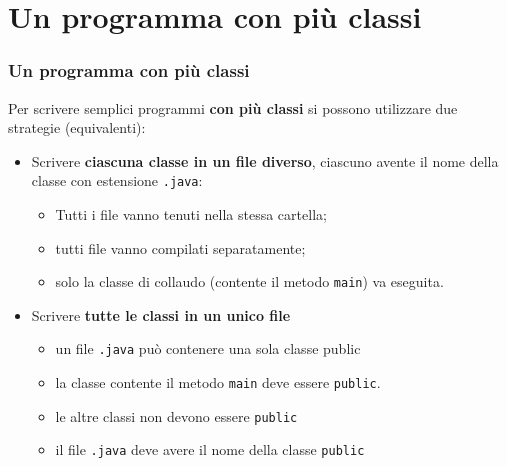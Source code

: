 \section*{Un programma con più classi}
\begin{frame}
\frametitle{Un programma con più classi}
\begin{block}{}
Per scrivere semplici programmi \textbf{\alert{con più classi}} si possono utilizzare due strategie (equivalenti):
\end{block}
\begin{block}{}
\begin{itemize}
\item Scrivere \textbf{\alert{ciascuna classe in un file diverso}}, ciascuno avente il nome della classe con estensione 
\texttt{.java}:
\begin{itemize}
\item Tutti i file vanno tenuti nella stessa cartella;
\item tutti file vanno compilati separatamente;
\item solo la classe di collaudo (contente il metodo \texttt{main}) va eseguita.
\end{itemize}
\end{itemize}
\end{block}
\begin{block}{}
\begin{itemize}
\item Scrivere \textbf{\alert{tutte le classi in un unico file}}
\begin{itemize}
\item un file \texttt{.java} può contenere una sola classe public
\item la classe contente il metodo \texttt{main} deve essere \texttt{public}.
\item le altre classi non devono essere \texttt{public}
\item il file \texttt{.java} deve avere il nome della classe \texttt{public}
\end{itemize}
\end{itemize}
\end{block}
\end{frame}


